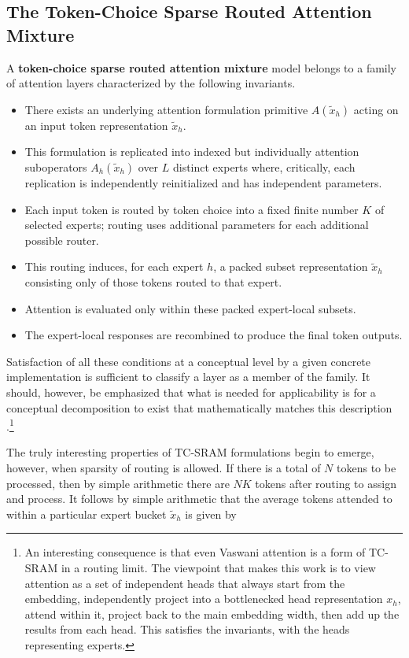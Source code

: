\documentclass[11pt]{article}
\begin{document}
\subsection{The Token-Choice Sparse Routed Attention Mixture}

A \textbf{token-choice sparse routed attention mixture} model belongs to a family of attention layers characterized by the following invariants.

\begin{itemize}
    \item There exists an underlying attention formulation primitive $A(\tilde{x}_h)$ acting on an input token representation $\tilde{x}_h$.
    \item This formulation is replicated into indexed but individually attention suboperators $A_h(\tilde{x}_h)$ over $L$ distinct experts where, critically, each replication is independently reinitialized and has independent parameters.
    \item Each input token is routed by token choice into a fixed finite number $K$ of selected experts; routing uses additional parameters for each additional possible router.
    \item This routing induces, for each expert $h$, a packed subset representation $\tilde{x}_h$ consisting only of those tokens routed to that expert.
    \item Attention is evaluated only within these packed expert-local subsets.
    \item The expert-local responses are recombined to produce the final token outputs.
\end{itemize}

Satisfaction of all these conditions at a conceptual level by a given concrete implementation is sufficient to classify a layer as a member of the family. It should, however, be emphasized that what is needed for applicability is for a conceptual decomposition to exist that mathematically matches this description \citep{vaswani2017attention, wang2023interpretability}.\footnote{An interesting consequence is that even Vaswani attention is a form of TC-SRAM in a routing limit. The viewpoint that makes this work is to view attention as a set of independent heads that always start from the embedding, independently project into a bottlenecked head representation $x_h$, attend within it, project back to the main embedding width, then add up the results from each head. This satisfies the invariants, with the heads representing experts.}

The truly interesting properties of TC-SRAM formulations begin to emerge, however, when sparsity of routing is allowed. If there is a total of $N$ tokens to be processed, then by simple arithmetic there are $NK$ tokens after routing to assign and process. It follows by simple arithmetic that the average tokens attended to within a particular expert bucket $\tilde{x}_h$ is given by
\end{document}
